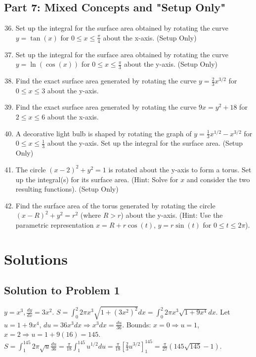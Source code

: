 \documentclass[12pt]{article}
\begin{document}
\subsection*{Part 7: Mixed Concepts and "Setup Only"}

\begin{enumerate}
    \setcounter{enumi}{35}
    \item Set up the integral for the surface area obtained by rotating the curve $y = \tan(x)$ for $0 \le x \le \frac{\pi}{4}$ about the x-axis. (Setup Only)

    \item Set up the integral for the surface area obtained by rotating the curve $y = \ln(\cos(x))$ for $0 \le x \le \frac{\pi}{3}$ about the y-axis. (Setup Only)

    \item Find the exact surface area generated by rotating the curve $y=\frac{2}{3}x^{3/2}$ for $0 \le x \le 3$ about the y-axis.

    \item Find the exact surface area generated by rotating the curve $9x = y^2+18$ for $2 \le x \le 6$ about the x-axis.

    \item A decorative light bulb is shaped by rotating the graph of $y = \frac{1}{3}x^{1/2} - x^{3/2}$ for $0 \le x \le \frac{1}{3}$ about the y-axis. Set up the integral for the surface area. (Setup Only)
    
    \item The circle $(x-2)^2 + y^2 = 1$ is rotated about the y-axis to form a torus. Set up the integral(s) for its surface area. (Hint: Solve for $x$ and consider the two resulting functions). (Setup Only)
    
    \item Find the surface area of the torus generated by rotating the circle $(x-R)^2 + y^2 = r^2$ (where $R>r$) about the y-axis. (Hint: Use the parametric representation $x=R+r\cos(t)$, $y=r\sin(t)$ for $0 \le t \le 2\pi$).

\end{enumerate}

\newpage
\section*{Solutions}

\subsection*{Solution to Problem 1}
$y=x^3, \frac{dy}{dx}=3x^2$. $S = \int_0^2 2\pi x^3 \sqrt{1+(3x^2)^2} dx = \int_0^2 2\pi x^3 \sqrt{1+9x^4} dx$.
Let $u=1+9x^4$, $du=36x^3 dx \Rightarrow x^3 dx = \frac{du}{36}$.
Bounds: $x=0 \Rightarrow u=1$, $x=2 \Rightarrow u=1+9(16)=145$.
$S = \int_1^{145} 2\pi \sqrt{u} \frac{du}{36} = \frac{\pi}{18} \int_1^{145} u^{1/2} du = \frac{\pi}{18} \left[\frac{2}{3}u^{3/2}\right]_1^{145} = \frac{\pi}{27}(145\sqrt{145}-1)$.
\end{document}
